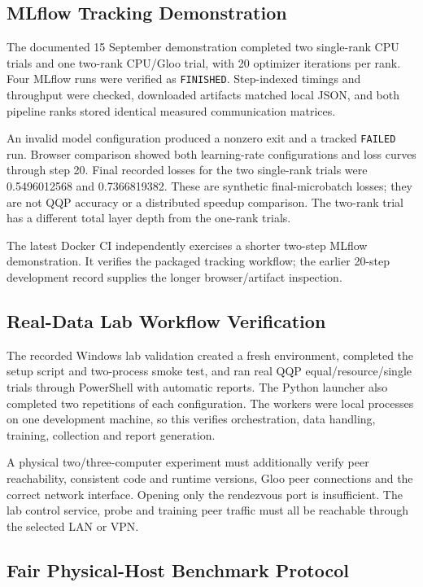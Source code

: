 \subsection{MLflow Tracking Demonstration}

The documented 15 September demonstration completed two single-rank CPU trials and one two-rank CPU/Gloo trial, with 20 optimizer iterations per rank. Four MLflow runs were verified as \texttt{FINISHED}. Step-indexed timings and throughput were checked, downloaded artifacts matched local JSON, and both pipeline ranks stored identical measured communication matrices.

An invalid model configuration produced a nonzero exit and a tracked \texttt{FAILED} run. Browser comparison showed both learning-rate configurations and loss curves through step 20. Final recorded losses for the two single-rank trials were 0.5496012568 and 0.7366819382. These are synthetic final-microbatch losses; they are not QQP accuracy or a distributed speedup comparison. The two-rank trial has a different total layer depth from the one-rank trials.

The latest Docker CI independently exercises a shorter two-step MLflow demonstration. It verifies the packaged tracking workflow; the earlier 20-step development record supplies the longer browser/artifact inspection.

\subsection{Real-Data Lab Workflow Verification}

The recorded Windows lab validation created a fresh environment, completed the setup script and two-process smoke test, and ran real QQP equal/resource/single trials through PowerShell with automatic reports. The Python launcher also completed two repetitions of each configuration. The workers were local processes on one development machine, so this verifies orchestration, data handling, training, collection and report generation.

A physical two/three-computer experiment must additionally verify peer reachability, consistent code and runtime versions, Gloo peer connections and the correct network interface. Opening only the rendezvous port is insufficient. The lab control service, probe and training peer traffic must all be reachable through the selected LAN or VPN.

\subsection{Fair Physical-Host Benchmark Protocol}

